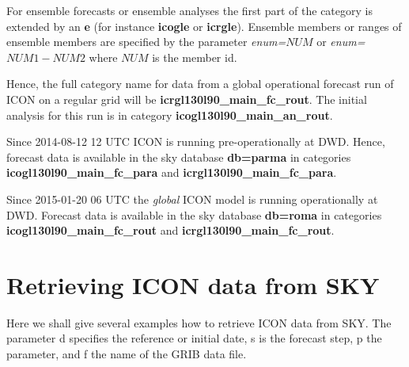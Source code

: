 For ensemble forecasts or ensemble analyses the first part of the
category is extended by an \textbf{e} (for instance \textbf{icogle}
or \textbf{icrgle}). Ensemble members or ranges of ensemble members
are specified by the parameter \emph{enum=}$NUM$
or \emph{enum=}$NUM1-NUM2$ where $NUM$ is the member id.

Hence, the full category name for data from a global operational forecast run of ICON on a
regular grid will be \textbf{icrgl130l90\_main\_fc\_rout}. The initial analysis for this
run is in category \textbf{icogl130l90\_main\_an\_rout}.

\begin{note}
Since 2014-08-12 12 UTC ICON is running pre-operationally at DWD. Hence, forecast data
is available in the sky database \textbf{db=parma} in categories
\textbf{icogl130l90\_main\_fc\_para} and \textbf{icrgl130l90\_main\_fc\_para}.
\end{note}

\begin{note}
Since 2015-01-20 06 UTC the \emph{global} ICON model is running operationally at DWD.
Forecast data is available in the sky database \textbf{db=roma} in categories
\textbf{icogl130l90\_main\_fc\_rout} and \textbf{icrgl130l90\_main\_fc\_rout}.
\end{note}

\section{Retrieving ICON data from SKY}\label{sec_example}

Here we shall give several examples how to retrieve ICON data from SKY.
The parameter d specifies the reference or initial date, s is the forecast step, p the parameter,
and f the name of the GRIB data file.

